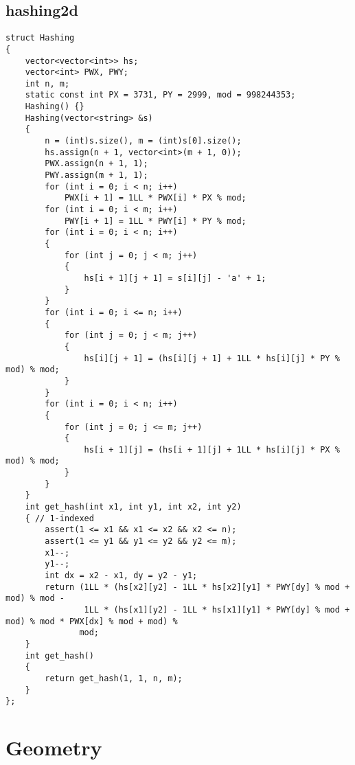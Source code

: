 \subsection*{hashing2d}
\begin{lstlisting}
struct Hashing
{
    vector<vector<int>> hs;
    vector<int> PWX, PWY;
    int n, m;
    static const int PX = 3731, PY = 2999, mod = 998244353;
    Hashing() {}
    Hashing(vector<string> &s)
    {
        n = (int)s.size(), m = (int)s[0].size();
        hs.assign(n + 1, vector<int>(m + 1, 0));
        PWX.assign(n + 1, 1);
        PWY.assign(m + 1, 1);
        for (int i = 0; i < n; i++)
            PWX[i + 1] = 1LL * PWX[i] * PX % mod;
        for (int i = 0; i < m; i++)
            PWY[i + 1] = 1LL * PWY[i] * PY % mod;
        for (int i = 0; i < n; i++)
        {
            for (int j = 0; j < m; j++)
            {
                hs[i + 1][j + 1] = s[i][j] - 'a' + 1;
            }
        }
        for (int i = 0; i <= n; i++)
        {
            for (int j = 0; j < m; j++)
            {
                hs[i][j + 1] = (hs[i][j + 1] + 1LL * hs[i][j] * PY % mod) % mod;
            }
        }
        for (int i = 0; i < n; i++)
        {
            for (int j = 0; j <= m; j++)
            {
                hs[i + 1][j] = (hs[i + 1][j] + 1LL * hs[i][j] * PX % mod) % mod;
            }
        }
    }
    int get_hash(int x1, int y1, int x2, int y2)
    { // 1-indexed
        assert(1 <= x1 && x1 <= x2 && x2 <= n);
        assert(1 <= y1 && y1 <= y2 && y2 <= m);
        x1--;
        y1--;
        int dx = x2 - x1, dy = y2 - y1;
        return (1LL * (hs[x2][y2] - 1LL * hs[x2][y1] * PWY[dy] % mod + mod) % mod -
                1LL * (hs[x1][y2] - 1LL * hs[x1][y1] * PWY[dy] % mod + mod) % mod * PWX[dx] % mod + mod) %
               mod;
    }
    int get_hash()
    {
        return get_hash(1, 1, n, m);
    }
};
\end{lstlisting}

\section*{Geometry}

